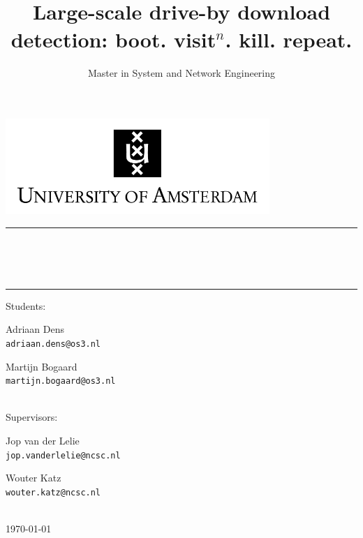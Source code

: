\documentclass{scrartcl}
\title{\horizontalrule{1pt}\\[0.5cm]Large-scale drive-by download detection: boot. visit$^n$. kill. repeat.}
\subtitle{Master in System and Network Engineering \\[0.5cm] \horizontalrule{1pt} }
\author{}
\date{}
\newcommand{\horizontalrule}[1]{\rule{\linewidth}{#1}}
\begin{document}

\centerline{\includegraphics[width=10cm]{Images/UvA-logo-english}}

\begin{center}
\horizontalrule{1pt}\\[0.5cm]
\\[0.1cm]
 \\[0.5cm]
\horizontalrule{1pt} 
\end{center}

\vspace{7cm}

\begin{center}

\Large
Students:\\[0.5cm]

\begin{minipage}{0.4\textwidth}
\begin{flushleft} \Large
Adriaan Dens\\\texttt{adriaan.dens@os3.nl}
\end{flushleft}
\end{minipage}%
\begin{minipage}{0.4\textwidth}
\begin{flushright} \Large
Martijn Bogaard\\\texttt{martijn.bogaard@os3.nl}
\end{flushright}
\end{minipage}\\[1.6cm]

\Large
Supervisors:\\[0.5cm]

\begin{minipage}{0.4\textwidth}
\begin{flushleft} \Large
Jop van der Lelie\\\texttt{jop.vanderlelie@ncsc.nl}
\end{flushleft}
\end{minipage}%
\begin{minipage}{0.4\textwidth}
\begin{flushright} \Large
Wouter Katz\\\texttt{wouter.katz@ncsc.nl}
\end{flushright}
\end{minipage}\\[1.6cm]

{\Large \today}
\end{center}
\end{document}

